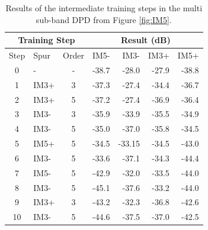  \begin{table}
 \begin{tabular}{c l c|r r r r}
	
	\multicolumn{3}{c|}{Training Step}  & \multicolumn{4}{c}{Result (dB)} \\ 
	\hline 
	Step & Spur & Order & IM5-  & IM3- & IM3+ & IM5+ \\ 
	\hline 
	0 & - & - & -38.7 & -28.0 & -27.9 & -38.8 \\ 
	
	1 & IM3+ & 3 & -37.3 & -27.4 & -34.4 & -36.7 \\ 
	
	2 & IM3+ & 5 & -37.2 & -27.4 & -36.9 & -36.4 \\ 
	
	3 & IM3- & 3 & -35.9 & -33.9 & -35.5 & -34.9 \\ 
	
	4 & IM3- & 5 & -35.0 & -37.0 & -35.8 & -34.5 \\ 
	
	5 & IM5+ & 5 & -34.5 & -33.15 & -34.5 & -43.0 \\ 
	
	6 & IM3- & 5 & -33.6 & -37.1 & -34.3 & -44.4 \\ 
	
	7 & IM5- & 5 & -42.9 & -32.0 & -33.5 & -44.0 \\ 
	
	8 & IM3- & 5 & -45.1 & -37.6 & -33.2 & -44.0 \\ 
	
	9 & IM3+ & 3 & -43.2 & -32.3 & -36.8 & -42.6 \\ 
	
	10 & IM3- & 5 & -44.6 & -37.5 & -37.0 & -42.5 \\ 
	
\end{tabular} 
\caption{Results of the intermediate training steps in the multi sub-band DPD from Figure \ref{fig:IM5}.}
\label{tab:IM5}
 \end{table}

 






